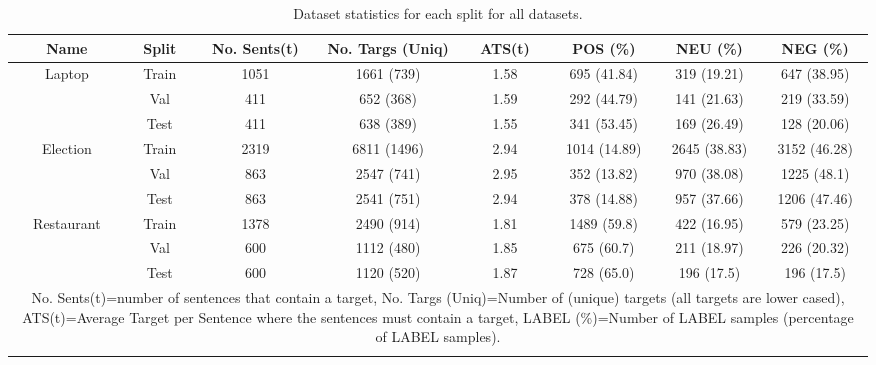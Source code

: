 
\begin{longtable}{|c|c|c|c|c|c|c|c|}
 \hline
Name & Split &  No. Sents(t) &  No. Targs (Uniq) &  ATS(t) & POS (\%) & NEU (\%) & NEG (\%) \\
 \hline
\multirow{3}{*}{Laptop} & Train &              1051 &         1661 (739) &    1.58 &   695 (41.84) &   319 (19.21) &   647 (38.95) \\
 &        Val &               411 &          652 (368) &    1.59 &   292 (44.79) &   141 (21.63) &   219 (33.59) \\
 &       Test &               411 &          638 (389) &    1.55 &   341 (53.45) &   169 (26.49) &   128 (20.06) \\
 \hline
\multirow{3}{*}{Election} &    Train &              2319 &         6811 (1496) &    2.94 &  1014 (14.89) &  2645 (38.83) &  3152 (46.28) \\
 &      Val &               863 &         2547 (741) &    2.95 &   352 (13.82) &   970 (38.08) &   1225 (48.1) \\
 &     Test &               863 &         2541 (751) &    2.94 &   378 (14.88) &   957 (37.66) &  1206 (47.46) \\
 \hline
\multirow{3}{*}{Restaurant} &  Train &              1378 &         2490 (914) &    1.81 &   1489 (59.8) &   422 (16.95) &   579 (23.25) \\
 &    Val &               600 &         1112 (480) &    1.85 &    675 (60.7) &   211 (18.97) &   226 (20.32) \\
 &   Test &               600 &         1120 (520) &    1.87 &    728 (65.0) &    196 (17.5) &    196 (17.5) \\
 \hline
 \multicolumn{8}{|p{0.95\linewidth}|}{No. Sents(t)=number of sentences that contain a target, No. Targs (Uniq)=Number of (unique) targets (all targets are lower cased), ATS(t)=Average Target per Sentence where the sentences must contain a target, LABEL (\%)=Number of LABEL samples (percentage of LABEL samples).} \\
 \hline
\caption{Dataset statistics for each split for all datasets.}
\label{table:augmentation_splits_dataset_statistics}
\end{longtable}